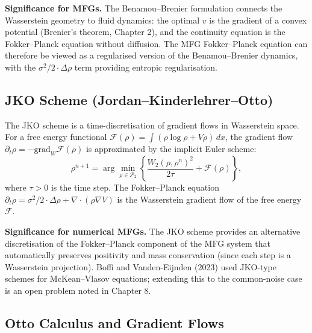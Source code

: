 \textbf{Significance for MFGs.} The Benamou--Brenier formulation connects
the Wasserstein geometry to fluid dynamics: the optimal $v$ is the gradient of
a convex potential (Brenier's theorem, Chapter 2), and the continuity equation
is the Fokker--Planck equation without diffusion. The MFG Fokker--Planck equation
can therefore be viewed as a regularised version of the Benamou--Brenier dynamics,
with the $\sigma^2/2 \cdot \Delta\rho$ term providing entropic regularisation.

\subsection{JKO Scheme (Jordan--Kinderlehrer--Otto)}

The JKO scheme \citep{jordankinderlehrerotto1998} is a time-discretisation of
gradient flows in Wasserstein space. For a free energy functional
$\mathcal{F}(\rho) = \int (\rho \log \rho + V\rho)\, dx$, the gradient flow
$\partial_t \rho = -\mathrm{grad}_W \mathcal{F}(\rho)$ is approximated by the
implicit Euler scheme:
\begin{equation}
    \rho^{n+1} = \arg\min_{\rho \in \mathcal{P}_2} \left\{
    \frac{W_2(\rho, \rho^n)^2}{2\tau} + \mathcal{F}(\rho) \right\},
    \label{eq:jko-scheme}
\end{equation}
where $\tau > 0$ is the time step. The Fokker--Planck equation
$\partial_t \rho = \sigma^2/2 \cdot \Delta\rho + \nabla\cdot(\rho\nabla V)$
is the Wasserstein gradient flow of the free energy $\mathcal{F}$.

\textbf{Significance for numerical MFGs.} The JKO scheme provides an
alternative discretisation of the Fokker--Planck component of the MFG system
that automatically preserves positivity and mass conservation (since each step is
a Wasserstein projection). Boffi and Vanden-Eijnden (2023) used JKO-type schemes
for McKean--Vlasov equations; extending this to the common-noise case is an open
problem noted in Chapter 8.

\subsection{Otto Calculus and Gradient Flows}

